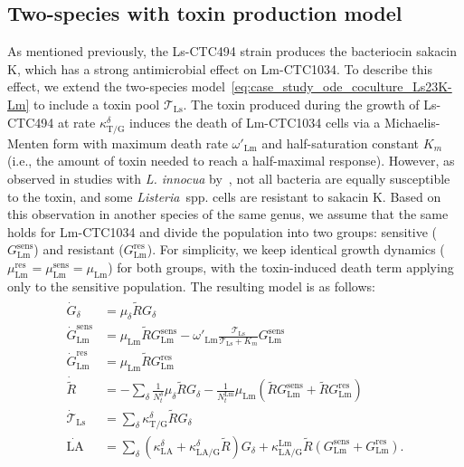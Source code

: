\documentclass[10pt,1p,authoryear]{elsarticle}
\numberwithin{equation}{section}
\begin{document}
\subsection{Two-species with toxin production model}
As mentioned previously, the Ls-CTC494 strain produces the bacteriocin sakacin K, which has a strong antimicrobial effect on Lm-CTC1034.
To describe this effect, we extend the two-species model~\eqref{eq:case_study_ode_coculture_Ls23K-Lm} to include a toxin pool $\mathcal{T}_\text{Ls}$.
The toxin produced during the growth of Ls-CTC494 at rate $\kappa_\text{T/G}^{\delta}$ induces the death of Lm-CTC1034 cells via a Michaelis-Menten form with maximum death rate $\omega'_\text{Lm}$ and half-saturation constant $K_m$ (i.e., the amount of toxin needed to reach a half-maximal response).
However, as observed in studies with \textit{L. innocua} by~\citet{leroyModelingBacteriocin2005}, not all bacteria are equally susceptible to the toxin, and some \textit{Listeria}~spp. cells are resistant to sakacin K.
Based on this observation in another species of the same genus, we assume that the same holds for Lm-CTC1034 and divide the population into two groups: sensitive ($G^\text{sens}_\text{Lm}$) and resistant ($G^\text{res}_\text{Lm}$).
For simplicity, we keep identical growth dynamics ($\mu^\text{res}_\text{Lm} = \mu^\text{sens}_\text{Lm} = \mu_\text{Lm}$) for both groups, with the toxin-induced death term applying only to the sensitive population.
The resulting model is as follows:
\begin{align}
    \begin{split}
        \dot G_\delta &= \mu_\delta \tilde{R} G_\delta\\
        \dot G^\text{sens}_\text{Lm} &= \mu_\text{Lm} \tilde{R} G^\text{sens}_\text{Lm} - \omega'_\text{Lm} \frac{\mathcal{T}_\text{Ls}}{\mathcal{T}_\text{Ls} + K_m} G^\text{sens}_\text{Lm}\\
        \dot G^\text{res}_\text{Lm} &= \mu_\text{Lm} \tilde{R} G^\text{res}_\text{Lm}\\
        \dot{\tilde{R}} &= - \sum_\delta \frac{1}{N_t^\delta} \mu_\delta \tilde{R} G_\delta - \frac{1}{N_t^\text{Lm}}\mu_\text{Lm}(\tilde{R} G^\text{sens}_\text{Lm} + \tilde{R} G^\text{res}_\text{Lm})\\
        \dot{\mathcal{T}}_\text{Ls} &= \sum_\delta \kappa_\text{T/G}^\delta \tilde{R} G_\delta \\
        \dot{\mathrm{LA}} &= \sum_\delta (\kappa_\text{LA}^\delta + \kappa_\text{LA/G}^\delta \tilde{R}) G_\delta +  \kappa_\text{LA/G}^\text{Lm} \tilde{R} (G^\text{sens}_\text{Lm} + G^\text{res}_\text{Lm}).
        \label{eq:case_study_ode_coculture_LsCTC494-LmCTC1034}
    \end{split}
\end{align}
\end{document}
